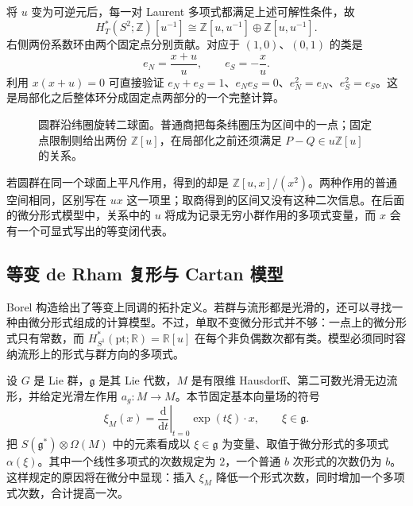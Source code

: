 \ProseParagraphBreak

将 \(u\) 变为可逆元后，每一对 Laurent 多项式都满足上述可解性条件，故
\[
	H_T^*(S^2;\mathbb Z)[u^{-1}]
	\cong\mathbb Z[u,u^{-1}]\oplus\mathbb Z[u,u^{-1}].
\]
右侧两份系数环由两个固定点分别贡献。对应于 \((1,0)\)、\((0,1)\) 的类是
\[
	e_N=\frac{x+u}{u},\qquad e_S=-\frac{x}{u}.
\]
利用 \(x(x+u)=0\) 可直接验证 \(e_N+e_S=1\)、\(e_Ne_S=0\)、\(e_N^2=e_N\)、\(e_S^2=e_S\)。这是局部化之后整体环分成固定点两部分的一个完整计算。

\begin{figure}[htbp]
	\centering
	
	\caption{圆群沿纬圈旋转二球面。普通商把每条纬圈压为区间中的一点；固定点限制则给出两份 \(\mathbb Z[u]\)，在局部化之前还须满足 \(P-Q\in u\mathbb Z[u]\) 的关系。}
	\label{g2:fig:equivariant-sphere}
\end{figure}

若圆群在同一个球面上平凡作用，得到的却是 \(\mathbb Z[u,x]/(x^2)\)。两种作用的普通空间相同，区别写在 \(ux\) 这一项里；取商得到的区间又没有这种二次信息。在后面的微分形式模型中，关系中的 \(u\) 将成为记录无穷小群作用的多项式变量，而 \(x\) 会有一个可显式写出的等变闭代表。

\subsection{等变 de Rham 复形与 Cartan 模型}
\label{g2:subsec:C01:04}

Borel 构造给出了等变上同调的拓扑定义。若群与流形都是光滑的，还可以寻找一种由微分形式组成的计算模型。不过，单取不变微分形式并不够：一点上的微分形式只有常数，而 \(H_{S^1}^*(\mathrm{pt};\mathbb R)=\mathbb R[u]\) 在每个非负偶数次都有类。模型必须同时容纳流形上的形式与群方向的多项式。

\ProseParagraphBreak
设 \(G\) 是 Lie 群，\(\mathfrak g\) 是其 Lie 代数，\(M\) 是有限维 Hausdorff、第二可数光滑无边流形，并给定光滑左作用 \(a_g\colon M\to M\)。本节固定基本向量场的符号
\begin{equation}\label{g2:eq:cartan-fundamental-field}
	\xi_M(x)=\left.\frac{\mathrm d}{\mathrm dt}\right|_{t=0}\exp(t\xi)\cdot x,
	\qquad \xi\in\mathfrak g.
\end{equation}
把 \(S(\mathfrak g^*)\otimes\Omega(M)\) 中的元素看成以 \(\xi\in\mathfrak g\) 为变量、取值于微分形式的多项式 \(\alpha(\xi)\)。其中一个线性多项式的次数规定为 \(2\)，一个普通 \(b\) 次形式的次数仍为 \(b\)。这样规定的原因将在微分中显现：插入 \(\xi_M\) 降低一个形式次数，同时增加一个多项式次数，合计提高一次。

